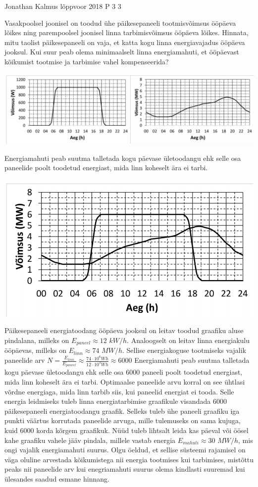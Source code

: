 {Jonathan Kalmus} %
{lõppvoor} %
{2018} %
{P 3} %
{3} %
{

\ifStatement
Vasakpoolsel joonisel on toodud ühe päikesepaneeli tootmisvõimsus ööpäeva lõikes ning parempoolsel joonisel linna tarbimisvõimsus ööpäeva lõikes. Hinnata, mitu taolist päikesepaneeli on vaja, et katta kogu linna energiavajadus ööpäeva jooksul. Kui suur peab olema minimaalselt linna energiamahuti, et ööpäevast kõikumist tootmise ja tarbimise vahel kompenseerida?
\begin{center}
	\includegraphics[width=0.5\linewidth]{2018-v3p-03-yl.png}
\end{center}
\fi

\ifHint
Energiamahuti peab suutma talletada kogu päevase ületoodangu ehk selle osa paneelide poolt toodetud energiast, mida linn koheselt ära ei tarbi.
\fi

\ifSolution
\begin{center}
	\includegraphics[width=0.5\linewidth]{2018-v3p-03-lah.png}
\end{center}
Päikesepaneeli energiatoodang ööpäeva jooksul on leitav toodud graafiku aluse pindalana, milleks on $E_{paneel} \approx 12$ $kW/h$. Analoogselt on leitav linna energiakulu ööpäevas, milleks on $E_{linn} \approx 74$ $MW/h$. Sellise energiakoguse tootmiseks vajalik paneelide arv $N = \frac{E_{linn}}{E_{paneel}} \approx \frac{74 \cdot 10^6Wh}{12 \cdot 10^3 Wh} \approx 6000$
Energiamahuti peab suutma talletada kogu päevase ületoodangu ehk selle osa $6000$ paneeli poolt toodetud energiast, mida linn koheselt ära ei tarbi. Optimaalse paneelide arvu korral on see ühtlasi võrdne energiaga, mida linn tarbib siis, kui paneelid energiat ei tooda. Selle energia leidmiseks tuleb linna energiatarbimise graafikule visandada $6000$ päikesepaneeli energiatoodangu graafik. Selleks tuleb ühe paneeli graafiku iga punkti väärtus korrutada paneelide arvuga, mille tulemuseks on sama kujuga, kuid $6000$ korda kõrgem graafikuk. Nüüd tuleb lihtsalt leida kas päeval või öösel kahe graafiku vahele jääv pindala, millele vastab energia $E_{mahuti} \approx 30$ $MW/h$, mis ongi vajalik energiamahuti suurus. Olgu öeldud, et sellise süsteemi rajamisel on väga oluline arvestada kõikumistega nii energia tootmises kui tarbimises, mistõttu peaks nii paneelide arv kui enegriamahuti suurus olema kindlasti suuremad kui ülesandes saadud esmane hinnang.
\fi
}